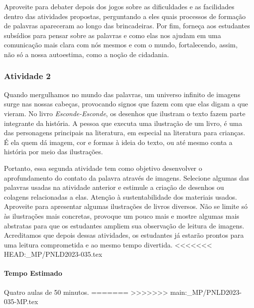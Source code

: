 \documentclass[11pt]{extarticle}
\begin{document}
Aproveite para debater depois dos jogos sobre as dificuldades e as facilidades dentro das atividades propostas, perguntando a eles quais processos de formação de palavras apareceram ao longo das brincadeiras. Por fim, forneça aos estudantes subsídios para pensar sobre as palavras e como elas nos ajudam em uma comunicação mais clara com nós mesmos e com o mundo, fortalecendo, assim, não só a nossa autoestima, como a noção de cidadania.

\subsubsection{Atividade 2}


Quando mergulhamos no mundo das palavras, um universo infinito de imagens surge nas nossas cabeças, provocando signos que fazem com que elas digam a que vieram. No livro \textit{Esconde-Esconde}, os desenhos que ilustram o texto fazem parte integrante da história. A pessoa que executa uma ilustração de um livro, é uma das personagens principais na literatura, em especial na literatura para crianças. É ela quem dá imagem, cor e formas à ideia do texto, ou até mesmo conta a história por meio das ilustrações. 

Portanto, essa segunda atividade tem como objetivo desenvolver o aprofundamento do contato da palavra através de imagens. Selecione algumas das palavras usadas na atividade anterior e estimule a criação de desenhos ou colagens relacionadas a elas. Atenção à sustentabilidade dos materiais usados. Aproveite para apresentar algumas ilustrações de livros diversos. Não se limite só às ilustrações mais concretas, provoque um pouco mais e mostre algumas mais abstratas para que os estudantes ampliem sua observação de leitura de imagens. Acreditamos que depois dessas atividades, os estudantes já estarão prontos para uma leitura comprometida e ao mesmo tempo divertida. 
<<<<<<< HEAD:_MP/PNLD2023-035.tex

\paragraph{Tempo Estimado} Quatro aulas de 50 minutos. 
=======
>>>>>>> main:_MP/PNLD2023-035-MP.tex
\end{document}

